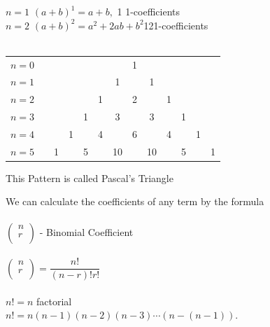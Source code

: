 \documentclass[11pt,a4paper]{article}
\begin{document}
$n=1$\hspace{0.4cm} $(a+b)^1=a+b,$\hspace{0.3cm} 1\hspace{0.2cm} 1-coefficients\\

$n=2$\hspace{0.4cm} $(a+b)^2=a^2+2ab+b^2$\hspace{0.3cm}1\hspace{0.2cm}2\hspace{0.2cm}1-coefficients\\\\



\begin{table}[h!]
\centering
\begin{tabular}{ccccccccccccc}
$n=0$ && &&&&&1&&&&&\\
$n=1$ && &&&&1&&1&&&&\\
$n=2$ && &&&1&&2&&1&&&\\
$n=3$ && &&1&&3&&3&&1&&\\
$n=4$ && & 1& &4&&6&&4&&1&\\
$n=5$ && 1&&5&&10&&10&&5&&1\\
\end{tabular}
\end{table}

\begin{center}
This Pattern is called Pascal's Triangle
\end{center}


We can calculate the coefficients of any term by the  formula\\\\
$
\begin{pmatrix}
n\\r\\
\end{pmatrix}
$ - Binomial Coefficient\\\\


$
\begin{pmatrix}
n\\r\\
\end{pmatrix}
=\dfrac{n!}{(n-r)!r!}
$\\\\

$n!=n$ factorial\\
$n!=n(n-1)(n-2)(n-3)\cdots (n-(n-1)).$\\
\end{document}
